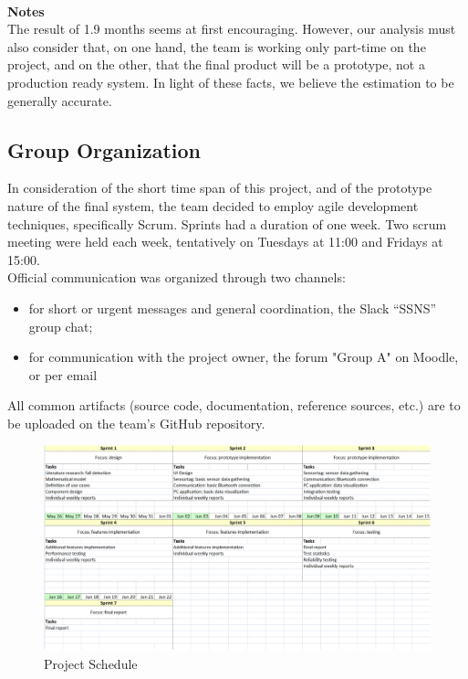 \documentclass[conference,12pt]{IEEETran}
\begin{document}
\textbf{\\Notes}
\\The result of 1.9 months seems at first encouraging. However, our 
analysis must also consider that, on one hand, the team is working only 
part-time on the project, and on the other, that the final product will 
be a prototype, not a production ready system. In light of these facts, 
we believe the estimation to be generally accurate.

\subsection{Group Organization}

In consideration of the short time span of this project, and of the prototype nature of the final system, the team decided to employ agile development techniques, specifically Scrum. Sprints had a duration of one week. Two scrum meeting were held each week, tentatively on Tuesdays at 11:00 and Fridays at 15:00.\\
Official communication was organized through two channels:
\begin{itemize}
	\item for short or urgent messages and general coordination, the Slack “SSNS” group chat;
	\item for communication with the project owner, the forum "Group A" on Moodle, or per email
\end{itemize}
All common artifacts (source code, documentation, reference sources, etc.) are to be uploaded on the team’s GitHub repository.

\FloatBarrier
\begin{figure}[!h]
	\centering
	\includegraphics[scale=0.50]{images/Proj_Sched.png}
	\caption{Project Schedule}
	\label{img:Proj_Sched}
\end{figure}
\FloatBarrier
\end{document}
